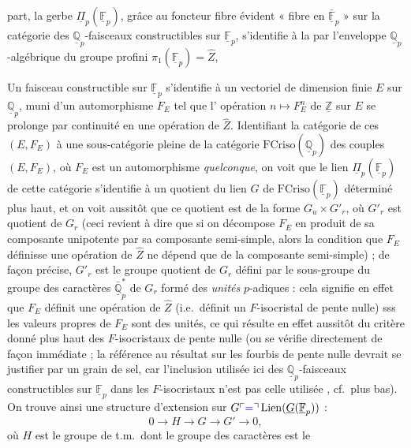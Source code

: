 \documentclass[11pt,a4paper]{article}
\begin{document}
part, la gerbe
$\underline{\Pi}_{p}(\underline{\mathbb{F}}_{p})$, grâce au \struck{\ill{}}
foncteur fibre évident « fibre en $\bar{\underline{\mathbb{F}}}_{p}$ » sur la
catégorie des $\underline{\mathbb{Q}}_{p}$-faisceaux constructibles sur
$\underline{\mathbb{F}}_{p}$, s'identifie à la \struck{\ill{}}
 par l'enveloppe
$\underline{\mathbb{Q}}_{p}$-algébrique du groupe profini
$\pi_{1}(\underline{\mathbb{F}}_{p}) = \hat{Z}$, \struck{\ill{}}

Un faisceau constructible sur $\underline{\mathbb{F}}_{p}$ s'identifie à un
vectoriel de dimension finie $E$ sur $\underline{\mathbb{Q}}_{p}$, muni d'un
automorphisme $F_{E}$ tel que l'\struck{\ill{}} opération
$n \mapsto F_{E}^{n}$ de $\underline{\mathbb{Z}}$ sur $E$ se prolonge par
continuité en une opération de $\hat{Z}$. Identifiant  la catégorie de ces $(E, F_{E})$ à une
sous-catégorie pleine de la catégorie \struck{\ill{}}
$\mathrm{FCriso}(\underline{\mathbb{Q}}_{p})$ des couples $(E, F_{E})$, où
$F_{E}$ est un automorphisme \emph{quelconque}, on voit que le lien
\struck{\ill{}} $\underline{\Pi}_{p}(\underline{\mathbb{F}}_{p})$ de cette
catégorie s'identifie à un quotient du lien $G$ de
$\mathrm{FCriso}(\underline{\mathbb{F}}_{p})$ déterminé plus haut, et on voit
aussitôt que ce quotient est de la forme $G_{u} \times G'_{r}$, où $G'_{r}$
est   quotient de $G_{r}$ (ceci revient à dire que si
on décompose $F_{E}$ en produit de sa composante unipotente par sa composante
semi-simple, alors la condition que $F_{E}$ définisse une opération de
$\hat{Z}$ ne dépend que de la composante semi-simple) ; de façon précise,
$G'_{r}$ est le groupe quotient de $G_{r}$ défini par le sous-groupe du
groupe des caractères $\bar{\underline{\mathbb{Q}}}^{*}_{p}$ de $G_{r}$ formé
des \emph{unités} $p$-adiques : cela signifie en effet que $F_{E}$
définit une opération de $\hat{Z}$ (i.e.\ définit un $F$-isocristal de pente
nulle) sss les valeurs propres de $F_{E}$ sont des unités, ce qui résulte en
effet aussitôt du critère donné plus haut des $F$-isocristaux de pente nulle
(ou se vérifie directement de façon immédiate ; la référence au résultat sur
les fourbis de pente nulle devrait se justifier par un grain de sel, car
l'inclusion utilisée ici des $\underline{\mathbb{Q}}_{p}$-faisceaux
constructibles sur $\underline{\mathbb{F}}_{p}$ dans les $F$-isocristaux
n'est pas celle utilisée  , cf.\ plus bas). On
trouve ainsi une structure d'extension sur
$G \add{=} \operatorname{Lien}(\underline{G}(\underline{\mathbb{F}}_{p}))$ :
\[
0 \longrightarrow H \longrightarrow G \longrightarrow G' \longrightarrow 0 ,
\]
où $H$ est le groupe de t.m.\ dont le groupe des caractères est le
\end{document}
